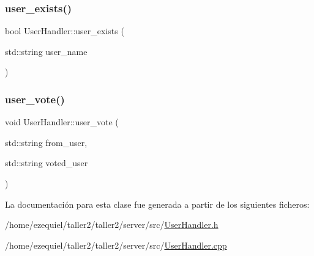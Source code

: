 \subsubsection{\texorpdfstring{user\+\_\+exists()}{user\_exists()}}
{\footnotesize\ttfamily bool User\+Handler\+::user\+\_\+exists (\begin{DoxyParamCaption}\item[{std\+::string}]{user\+\_\+name }\end{DoxyParamCaption})}

\mbox{\label{classUserHandler_a0d5cc1c26560cd14e4f1a9bcf22db18a}} 
\subsubsection{\texorpdfstring{user\+\_\+vote()}{user\_vote()}}
{\footnotesize\ttfamily void User\+Handler\+::user\+\_\+vote (\begin{DoxyParamCaption}\item[{std\+::string}]{from\+\_\+user,  }\item[{std\+::string}]{voted\+\_\+user }\end{DoxyParamCaption})}



La documentación para esta clase fue generada a partir de los siguientes ficheros\+:\begin{DoxyCompactItemize}
\item 
/home/ezequiel/taller2/taller2/server/src/\hyperlink{UserHandler_8h}{User\+Handler.\+h}\item 
/home/ezequiel/taller2/taller2/server/src/\hyperlink{UserHandler_8cpp}{User\+Handler.\+cpp}\end{DoxyCompactItemize}
